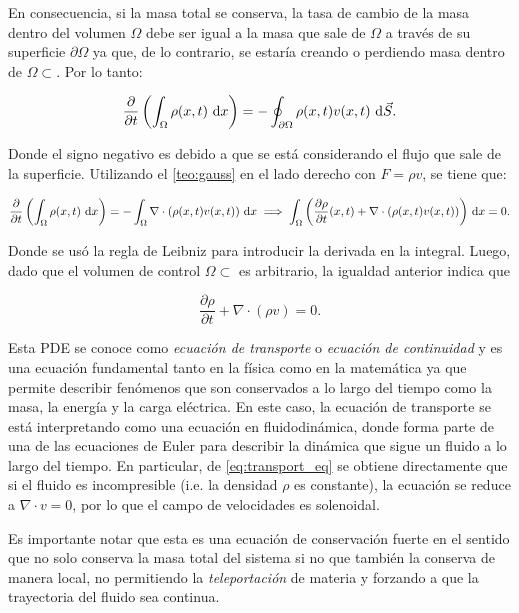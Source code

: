 En consecuencia, si la masa total se conserva, la tasa de cambio de la masa dentro del volumen $\Omega$ debe ser igual a la masa que sale de $\Omega$ a través de su superficie $\partial\Omega$ ya que, de lo contrario, se estaría creando o perdiendo masa dentro de $\Omega\subset\xspace$. Por lo tanto:

\begin{equation*}
	\frac{\partial}{\partial t}\left(\int_\Omega \rho(x,t) \,\operatorname{d}\! x\right)
	= - \oint_{\partial\Omega} \rho(x,t)v(x,t) \,\operatorname{d}\! \vec{S} .
\end{equation*}

Donde el signo negativo es debido a que se está considerando el flujo que sale de la superficie. Utilizando el \autoref{teo:gauss} en el lado derecho con $F=\rho v$, se tiene que:

\begin{equation*}
	\frac{\partial}{\partial t}\left(\int_\Omega \rho(x,t) \,\operatorname{d}\! x\right)
	= - \int_\Omega \nabla\cdot\left(\rho(x,t)v(x,t)\right) \,\operatorname{d}\! x
	\implies
	\int_\Omega \left(\frac{\partial\rho}{\partial t}(x,t) + \nabla\cdot(\rho(x,t) v(x,t))\right) \,\operatorname{d}\! x = 0 .
\end{equation*}

Donde se usó la regla de Leibniz para introducir la derivada en la integral. Luego, dado que el volumen de control $\Omega\subset\xspace$ es arbitrario, la igualdad anterior indica que

\begin{equation}
	\label{eq:transport_eq}
	\frac{\partial\rho}{\partial t} + \nabla\cdot(\rho v) = 0 .
\end{equation}

Esta PDE se conoce como \textit{ecuación de transporte} o \textit{ecuación de continuidad} y es una ecuación fundamental tanto en la física como en la matemática ya que permite describir fenómenos que son conservados a lo largo del tiempo como la masa, la energía y la carga eléctrica. En este caso, la ecuación de transporte se está interpretando como una ecuación en fluidodinámica, donde forma parte de una de las ecuaciones de Euler para describir la dinámica que sigue un fluido a lo largo del tiempo. En particular, de \eqref{eq:transport_eq} se obtiene directamente que si el fluido es incompresible (i.e. la densidad $\rho$ es constante), la ecuación se reduce a $\nabla\cdot v = 0$, por lo que el campo de velocidades es solenoidal.

Es importante notar que esta es una ecuación de conservación fuerte en el sentido que no solo conserva la masa total del sistema si no que también la conserva de manera local, no permitiendo la \textit{teleportación} de materia y forzando a que la trayectoria del fluido sea continua.

